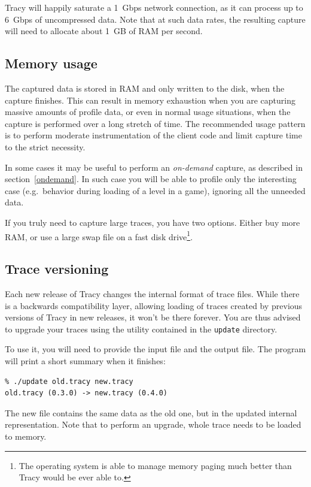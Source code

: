 \documentclass[hidelinks,titlepage,a4paper]{article}
\begin{document}
Tracy will happily saturate a 1~Gbps network connection, as it can process up to 6~Gbps of uncompressed data. Note that at such data rates, the resulting capture will need to allocate about 1~GB of RAM per second.

\subsection{Memory usage}

The captured data is stored in RAM and only written to the disk, when the capture finishes. This can result in memory exhaustion when you are capturing massive amounts of profile data, or even in normal usage situations, when the capture is performed over a long stretch of time. The recommended usage pattern is to perform moderate instrumentation of the client code and limit capture time to the strict necessity.

In some cases it may be useful to perform an \emph{on-demand} capture, as described in section~\ref{ondemand}. In such case you will be able to profile only the interesting case (e.g.\ behavior during loading of a level in a game), ignoring all the unneeded data.

If you truly need to capture large traces, you have two options. Either buy more RAM, or use a large swap file on a fast disk drive\footnote{The operating system is able to manage memory paging much better than Tracy would be ever able to.}.

\subsection{Trace versioning}

Each new release of Tracy changes the internal format of trace files. While there is a backwards compatibility layer, allowing loading of traces created by previous versions of Tracy in new releases, it won't be there forever. You are thus advised to upgrade your traces using the utility contained in the \texttt{update} directory.

To use it, you will need to provide the input file and the output file. The program will print a short summary when it finishes:

\begin{verbatim}
% ./update old.tracy new.tracy
old.tracy (0.3.0) -> new.tracy (0.4.0)
\end{verbatim}

The new file contains the same data as the old one, but in the updated internal representation. Note that to perform an upgrade, whole trace needs to be loaded to memory.
\end{document}
